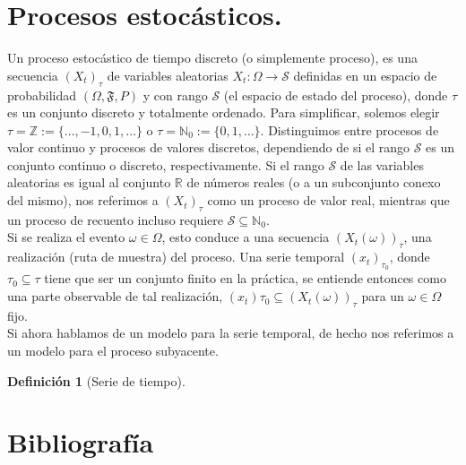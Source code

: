 \documentclass[12pt]{article}
\newtheorem{definition}{Definición}
\begin{document}
\section{Procesos estocásticos.}
Un proceso estocástico de tiempo discreto (o simplemente proceso), es una secuencia $(X_t)_\tau$ de variables aleatorias $X_t : \Omega \to \mathcal{S}$ definidas en un espacio de probabilidad $(\Omega, \mathfrak{F}, P)$ y con rango $\mathcal{S}$ (el espacio de estado del proceso), donde $\tau$ es un conjunto discreto y totalmente ordenado. Para simplificar, solemos elegir $\tau = \mathbb{Z} := \{\ldots,-1, 0, 1,\ldots\}$ o $\tau = \mathbb{N}_0 := \{0, 1,\ldots\}$. Distinguimos entre procesos de valor continuo y procesos de valores discretos, dependiendo de si el rango $\mathcal S$ es un conjunto continuo o discreto, respectivamente. Si el rango $\mathcal{S}$ de las variables aleatorias es igual al conjunto $\mathbb R$ de números reales (o a un subconjunto conexo del mismo), nos referimos a $(X_t)_\tau$ como un proceso de valor real, mientras que un proceso de recuento incluso requiere $\mathcal S \subseteq \mathbb{N}_0$.\\
Si se realiza el evento $\omega \in \Omega$, esto conduce a una secuencia $(X_t(\omega))_\tau$, una realización (ruta de muestra) del proceso. Una serie temporal $(x_t)_{\tau_0}$, donde $\tau_0 \subseteq \tau$ tiene que ser un conjunto finito en la práctica, se entiende entonces como una parte observable de tal realización, $(x_t)\tau_0 \subseteq (X_t(\omega))_\tau$ para un $\omega \in \Omega$ fijo.\\

Si ahora hablamos de un modelo para la serie temporal, de hecho nos referimos a un modelo para el proceso subyacente.

\begin{definition}[Serie de tiempo]
    
\end{definition}



\section{Bibliografía}
\label{Bibliography}
	 
        
\end{document}
